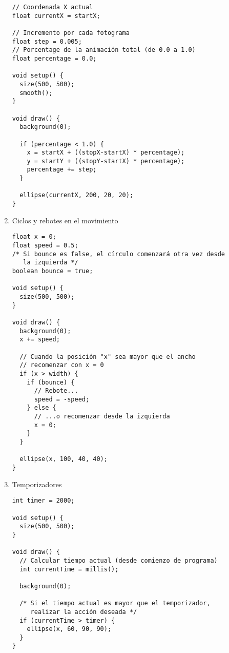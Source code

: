 \documentclass[a4paper,oneside]{article}
\begin{document}
\begin{enumerate}
\begin{verbatim}
// Coordenada X actual
float currentX = startX;

// Incremento por cada fotograma
float step = 0.005;
// Porcentage de la animación total (de 0.0 a 1.0)
float percentage = 0.0;

void setup() {
  size(500, 500);
  smooth();
}

void draw() {
  background(0);

  if (percentage < 1.0) {
    x = startX + ((stopX-startX) * percentage);
    y = startY + ((stopY-startX) * percentage);
    percentage += step;
  }

  ellipse(currentX, 200, 20, 20);
}
    \end{verbatim}

\newpage
  \item Ciclos y rebotes en el movimiento

    \begin{verbatim}
float x = 0;
float speed = 0.5;
/* Si bounce es false, el círculo comenzará otra vez desde
   la izquierda */
boolean bounce = true;

void setup() {
  size(500, 500);
}

void draw() {
  background(0);
  x += speed;

  // Cuando la posición "x" sea mayor que el ancho
  // recomenzar con x = 0
  if (x > width) {
    if (bounce) {
      // Rebote...
      speed = -speed;
    } else {
      // ...o recomenzar desde la izquierda
      x = 0;
    }
  }

  ellipse(x, 100, 40, 40);
}
    \end{verbatim}

  \item Temporizadores

    \begin{verbatim}
int timer = 2000;

void setup() {
  size(500, 500);
}

void draw() {
  // Calcular tiempo actual (desde comienzo de programa)
  int currentTime = millis();

  background(0);

  /* Si el tiempo actual es mayor que el temporizador,
     realizar la acción deseada */
  if (currentTime > timer) {
    ellipse(x, 60, 90, 90);
  }
}
    \end{verbatim}

      
      
\end{enumerate}
\end{document}
